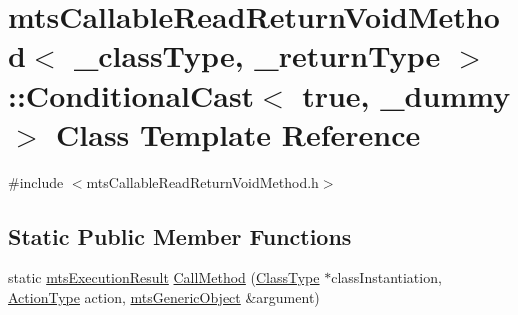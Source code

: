 \hypertarget{classmts_callable_read_return_void_method_1_1_conditional_cast_3_01true_00_01__dummy_01_4}{\section{mts\-Callable\-Read\-Return\-Void\-Method$<$ \-\_\-class\-Type, \-\_\-return\-Type $>$\-:\-:Conditional\-Cast$<$ true, \-\_\-dummy $>$ Class Template Reference}
\label{classmts_callable_read_return_void_method_1_1_conditional_cast_3_01true_00_01__dummy_01_4}
}


{\ttfamily \#include $<$mts\-Callable\-Read\-Return\-Void\-Method.\-h$>$}

\subsection*{Static Public Member Functions}
\begin{DoxyCompactItemize}
\item 
static \hyperlink{classmts_execution_result}{mts\-Execution\-Result} \hyperlink{classmts_callable_read_return_void_method_1_1_conditional_cast_3_01true_00_01__dummy_01_4_ad25d200a48d40f9eeece2798b1435c54}{Call\-Method} (\hyperlink{classmts_callable_read_return_void_method_a694e26a4c7fc28f0c739aa2f2ab97e12}{Class\-Type} $\ast$class\-Instantiation, \hyperlink{classmts_callable_read_return_void_method_a7f3934dc425501d4af892248c4930525}{Action\-Type} action, \hyperlink{classmts_generic_object}{mts\-Generic\-Object} \&argument)
\end{DoxyCompactItemize}


